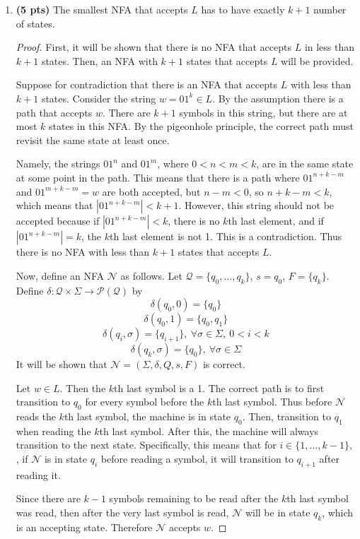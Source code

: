\documentclass[11pt]{article}
\begin{document}
\begin{enumerate}[label=\textbf{Q\arabic*.}]
\begin{enumerate}[label=\textit{\alph*)}]
\item \textbf{(5 pts)} The smallest NFA that accepts $L$ has to have exactly $k + 1$ number of states.
\begin{proof}
	First, it will be shown that there is no NFA that accepts \(L\) in less than \(k+1\) states. Then, an NFA with \(k+1\) states that accepts \(L\) will be provided.
	
	Suppose for contradiction that there is an NFA that accepts \(L\) with less than \(k + 1\) states. Consider the string \(w = 01^k \in L\). By the assumption there is a path that accepts \(w\). There are \(k+1\) symbols in this string, but there are at most \(k\) states in this NFA. By the pigeonhole principle, the correct path must revisit the same state at least once.
	
	Namely, the strings \(01^n\) and \(01^m\), where \(0 < n < m < k\), are in the same state at some point in the path. This means that there is a path where \(01^{n+k-m}\) and \(01^{m+k-m} = w\) are both accepted, but \(n - m < 0\), so \(n + k - m < k\), which means that \(|01^{n+k-m}| < k+1\). However, this string should not be accepted because if \(|01^{n+k-m}| < k\), there is no \(k\)th last element, and if \(|01^{n+k-m}| = k\), the \(k\)th last element is not 1. This is a contradiction. Thus there is no NFA with less than \(k+1\) states that accepts \(L\).

	Now, define an NFA \(\mathcal{N}\) as follows. Let \(\mathcal{Q} = \{q_0, ..., q_k\}\), \(s = q_0\), \(F = \{q_k\}\). Define \(\delta : \mathcal{Q} \times \Sigma \to \mathcal{P} (\mathcal{Q})\) by
	\[
		\delta (q_0, 0) = \{ q_0 \} 
	\]
	\[
		\delta (q_0, 1) = \{ q_0,q_1 \} 
	\]
	\[
		\delta (q_i, \sigma ) = \{ q_{i+1} \} ,\ \forall \sigma \in \Sigma,\ 0 < i < k
	\]
	\[
		\delta (q_k, \sigma) = \{q_0\},\ \forall \sigma \in \Sigma 
	\]
	It will be shown that \(\mathcal{N} = (\Sigma , \delta , Q, s, F)\) is correct.

	Let \(w \in L\). Then the \(k\)th last symbol is a 1. The correct path is to first transition to \(q_0\) for every symbol before the \(k\)th last symbol. Thus before \(\mathcal{N}\) reads the \(k\)th last symbol, the machine is in state \(q_0\). Then, transition to \(q_1\) when reading the \(k\)th last symbol. After this, the machine will always transition to the next state. Specifically, this means that for \(i \in \{1, ..., k-1 \},\), if \(\mathcal{N}\) is in state \(q_i\) before reading a symbol, it will transition to \(q_{i+1}\) after reading it.

	Since there are \(k-1\) symbols remaining to be read after the \(k\)th last symbol was read, then after the very last symbol is read, \(\mathcal{N}\) will be in state \(q_k\), which is an accepting state. Therefore \(\mathcal{N}\) accepts \(w\).


\end{proof}
\end{enumerate}
\end{enumerate}
\end{document}
